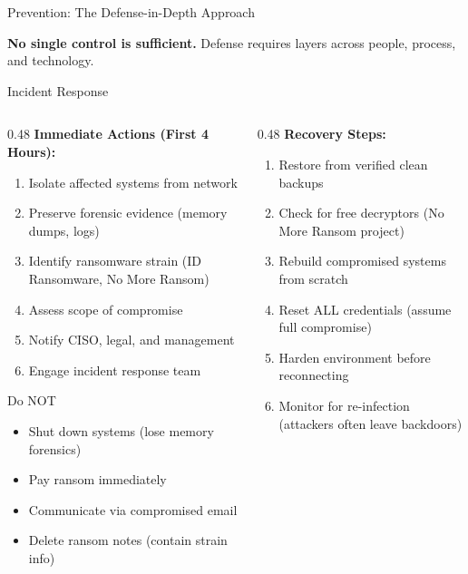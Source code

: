 \documentclass[aspectratio=169]{beamer}
\begin{document}
\begin{frame}{Prevention: The Defense-in-Depth Approach}
  \vspace{0.5em}
  \begin{center}
    \textcolor{textgray}{\footnotesize \textbf{No single control is sufficient.} Defense requires layers across people, process, and technology.}
  \end{center}
\end{frame}

\begin{frame}{Incident Response}
  \begin{columns}[T]
    \begin{column}{0.48\textwidth}
      \textbf{Immediate Actions (First 4 Hours):}
      \begin{enumerate}
        \item \alert{Isolate} affected systems from network
        \item Preserve forensic evidence (memory dumps, logs)
        \item Identify ransomware strain (ID Ransomware, No More Ransom)
        \item Assess scope of compromise
        \item Notify CISO, legal, and management
        \item Engage incident response team
      \end{enumerate}

      \vspace{0.5em}
      \begin{dangerbox}{Do NOT}
        \begin{itemize}
          \item Shut down systems (lose memory forensics)
          \item Pay ransom immediately
          \item Communicate via compromised email
          \item Delete ransom notes (contain strain info)
        \end{itemize}
      \end{dangerbox}
    \end{column}
    \begin{column}{0.48\textwidth}
      \textbf{Recovery Steps:}
      \begin{enumerate}
        \item Restore from verified clean backups
        \item Check for free decryptors (No More Ransom project)
        \item Rebuild compromised systems from scratch
        \item Reset ALL credentials (assume full compromise)
        \item Harden environment before reconnecting
        \item Monitor for re-infection (attackers often leave backdoors)
      \end{enumerate}


\end{column}
\end{columns}
\end{frame}
\end{document}
